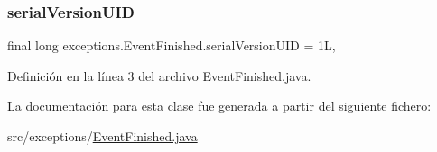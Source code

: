 \subsubsection{\texorpdfstring{serialVersionUID}{serialVersionUID}}
{\footnotesize\ttfamily final long exceptions.\+Event\+Finished.\+serial\+Version\+U\+ID = 1L\hspace{0.3cm}{\ttfamily [static]}, {\ttfamily [private]}}



Definición en la línea 3 del archivo Event\+Finished.\+java.



La documentación para esta clase fue generada a partir del siguiente fichero\+:\begin{DoxyCompactItemize}
\item 
src/exceptions/\mbox{\hyperlink{EventFinished_8java}{Event\+Finished.\+java}}\end{DoxyCompactItemize}
